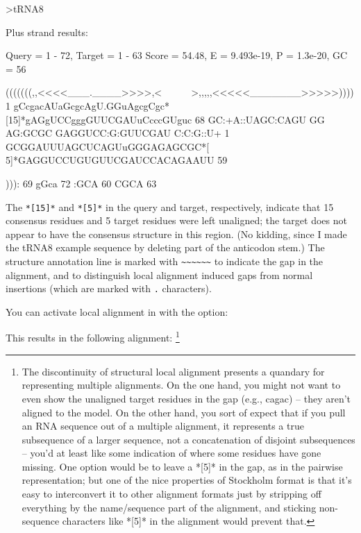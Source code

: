 {\samepage
\begin{sreoutput}
>tRNA8

  Plus strand results:

 Query = 1 - 72, Target = 1 - 63
 Score = 54.48, E = 9.493e-19, P = 1.3e-20, GC =  56

           (((((((,,<<<<___.____>>>>,<~~~~~~>,,,,,<<<<<_______>>>>>))))
         1 gCcgacAUaGcgcAgU.GGuAgcgCgc*[15]*gAGgUCCgggGUUCGAUuCcccGUguc 68      
           GC:+A::UAGC:CAGU GG AG:GCGC      GAGGUCC:G:GUUCGAU C:C:G::U+
         1 GCGGAUUUAGCUCAGUuGGGAGAGCGC*[ 5]*GAGGUCCUGUGUUCGAUCCACAGAAUU 59      

           ))):
        69 gGca 72      
           :GCA
        60 CGCA 63      
\end{sreoutput}
}

The \verb+*[15]*+ and \verb+*[5]*+ in the query and target,
respectively, indicate that 15 consensus residues and 5 target
residues were left unaligned; the target does not appear to have the
consensus structure in this region. (No kidding, since I made the
tRNA8 example sequence by deleting part of the anticodon stem.)  The
structure annotation line is marked with \verb+~~~~~~+ to indicate the
gap in the alignment, and to distinguish local alignment induced gaps
from normal insertions (which are marked with \verb+.+ characters).

You can activate local alignment in  with the 
option:


This results in the following alignment:
\footnote{The discontinuity of structural local alignment presents a
quandary for representing multiple alignments. On the one hand, you
might not want to even show the unaligned target residues in the gap
(e.g., cagac) -- they aren't aligned to the model. On the other hand,
you sort of expect that if you pull an RNA sequence out of a multiple
alignment, it represents a true subsequence of a larger sequence, not
a concatenation of disjoint subsequences -- you'd at least like some
indication of where some residues have gone missing. One option would
be to leave a *[5]* in the gap, as in the pairwise
representation; but one of the nice properties of Stockholm format is
that it's easy to interconvert it to other alignment formats just by
stripping off everything by the name/sequence part of the alignment,
and sticking non-sequence characters like *[5]* in the
alignment would prevent that.}


